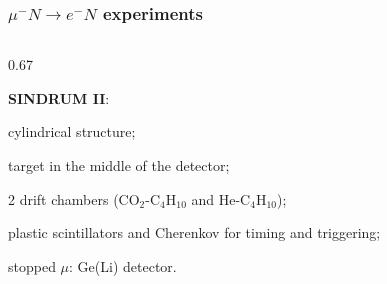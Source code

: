 \documentclass{beamer}
\begin{document}
    \begin{frame}
        \frametitle{$\mu^- N \rightarrow e^- N$ experiments}
        \vspace{-3mm}
\begin{columns}
 \begin{column}{0.67\framewidth}
 \setlength{\leftmargini}{1.1em}

    \begin{itemize}

        {\small    
   
   \item \textbf{SINDRUM II}: }

\begin{itemize}
    {\small  
    \item cylindrical structure;
    \item target in the middle of the detector;
    \item 2 drift chambers (CO$_2$-C$_4$H$_10$ and He-C$_4$H$_10$); 
    \item plastic scintillators and Cherenkov for timing and triggering;
    \item stopped $\mu$: Ge(Li) detector.
    }
\end{itemize}


   {\small    
   
}
\end{itemize}
\end{column}
\end{columns}
\end{frame}
\end{document}
